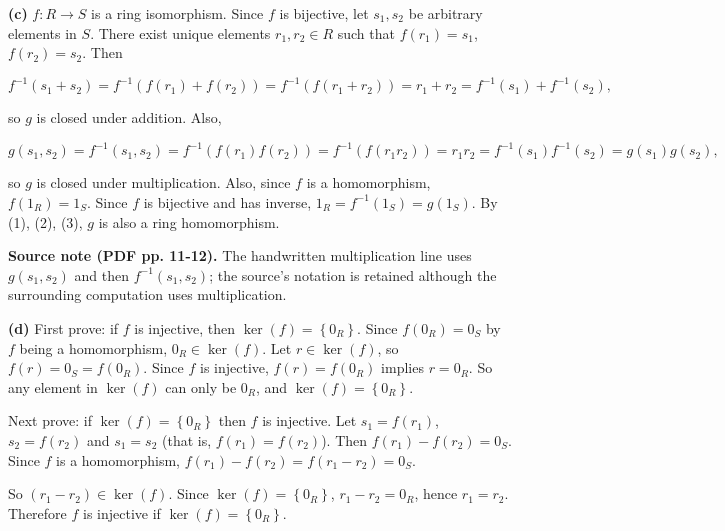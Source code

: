 \textbf{(c)} \(f:R\rightarrow S\) is a ring isomorphism. Since \(f\) is bijective, let \(s_{1},s_{2}\) be arbitrary elements in \(S\). There exist unique elements \(r_{1},r_{2} \in R\) such that \(f\left( r_{1} \right) = s_{1}\), \(f\left( r_{2} \right) = s_{2}\). Then

\[f^{- 1}\left( {s_{1} + s_{2}} \right) = f^{- 1}\left( {f\left( r_{1} \right) + f\left( r_{2} \right)} \right) = f^{- 1}\left( {f\left( {r_{1} + r_{2}} \right)} \right) = r_{1} + r_{2} = f^{- 1}\left( s_{1} \right) + f^{- 1}\left( s_{2} \right),\]

so \(g\) is closed under addition. Also,

\[g\left( {s_{1},s_{2}} \right) = f^{- 1}\left( {s_{1},s_{2}} \right) = f^{- 1}\left( {f\left( r_{1} \right)f\left( r_{2} \right)} \right) = f^{- 1}\left( {f\left( {r_{1}r_{2}} \right)} \right) = r_{1}r_{2} = f^{- 1}\left( s_{1} \right)f^{- 1}\left( s_{2} \right) = g\left( s_{1} \right)g\left( s_{2} \right),\]

so \(g\) is closed under multiplication. Also, since \(f\) is a homomorphism, \(f\left( 1_{R} \right) = 1_{S}\). Since \(f\) is bijective and has inverse, \(1_{R} = f^{- 1}\left( 1_{S} \right) = g\left( 1_{S} \right)\). By (1), (2), (3), \(g\) is also a ring homomorphism.

\textbf{Source note (PDF pp. 11-12).} The handwritten multiplication line uses \(g\left( {s_{1},s_{2}} \right)\) and then \(f^{- 1}\left( {s_{1},s_{2}} \right)\); the source's notation is retained although the surrounding computation uses multiplication.

\textbf{(d)} First prove: if \(f\) is injective, then \(\ker(f) = \left\{ 0_{R} \right\}\). Since \(f\left( 0_{R} \right) = 0_{S}\) by \(f\) being a homomorphism, \(0_{R} \in \ker(f)\). Let \(r \in \ker(f)\), so \(f(r) = 0_{S} = f\left( 0_{R} \right)\). Since \(f\) is injective, \(f(r) = f\left( 0_{R} \right)\) implies \(r = 0_{R}\). So any element in \(\ker(f)\) can only be \(0_{R}\), and \(\ker(f) = \left\{ 0_{R} \right\}\).

Next prove: if \(\ker(f) = \left\{ 0_{R} \right\}\) then \(f\) is injective. Let \(s_{1} = f\left( r_{1} \right)\), \(s_{2} = f\left( r_{2} \right)\) and \(s_{1} = s_{2}\) (that is, \(f\left( r_{1} \right) = f\left( r_{2} \right)\)). Then \(f\left( r_{1} \right) - f\left( r_{2} \right) = 0_{S}\). Since \(f\) is a homomorphism, \(f\left( r_{1} \right) - f\left( r_{2} \right) = f\left( {r_{1} - r_{2}} \right) = 0_{S}\).

So \(\left( {r_{1} - r_{2}} \right) \in \ker(f)\). Since \(\ker(f) = \left\{ 0_{R} \right\}\), \(r_{1} - r_{2} = 0_{R}\), hence \(r_{1} = r_{2}\). Therefore \(f\) is injective if \(\ker(f) = \left\{ 0_{R} \right\}\).
